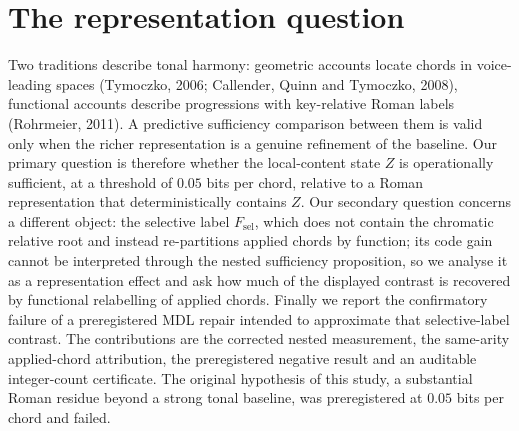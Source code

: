 \documentclass[11pt]{article}
\begin{document}
\section{The representation question}
Two traditions describe tonal harmony: geometric accounts locate chords in voice-leading spaces (Tymoczko, 2006; Callender, Quinn and Tymoczko, 2008), functional accounts describe progressions with key-relative Roman labels (Rohrmeier, 2011). A predictive sufficiency comparison between them is valid only when the richer representation is a genuine refinement of the baseline. Our primary question is therefore whether the local-content state $Z$ is operationally sufficient, at a threshold of $0.05$ bits per chord, relative to a Roman representation that deterministically contains $Z$. Our secondary question concerns a different object: the selective label $F_{\mathrm{sel}}$, which does not contain the chromatic relative root and instead re-partitions applied chords by function; its code gain cannot be interpreted through the nested sufficiency proposition, so we analyse it as a representation effect and ask how much of the displayed contrast is recovered by functional relabelling of applied chords. Finally we report the confirmatory failure of a preregistered MDL repair intended to approximate that selective-label contrast. The contributions are the corrected nested measurement, the same-arity applied-chord attribution, the preregistered negative result and an auditable integer-count certificate. The original hypothesis of this study, a substantial Roman residue beyond a strong tonal baseline, was preregistered at $0.05$ bits per chord and failed.
\end{document}
